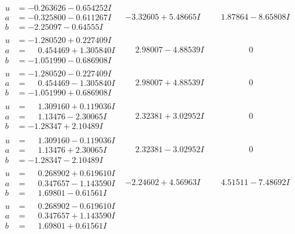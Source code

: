 \documentclass[1p]{elsarticle_modified}
\theoremstyle{definition}
\begin{document}
$$\begin{array}{c|c|c}
\begin{aligned}
u &= -0.263626 - 0.654252 I \\
a &= -0.325800 - 0.611267 I \\
b &= -2.25097 - 0.64555 I\end{aligned}
 & -3.32605 + 5.48665 I & \phantom{-}1.87864 - 8.65808 I \\ \hline\begin{aligned}
u &= -1.280520 + 0.227409 I \\
a &= \phantom{-}0.454469 + 1.305840 I \\
b &= -1.051990 - 0.686908 I\end{aligned}
 & \phantom{-}2.98007 - 4.88539 I & \phantom{-0.000000 } 0 \\ \hline\begin{aligned}
u &= -1.280520 - 0.227409 I \\
a &= \phantom{-}0.454469 - 1.305840 I \\
b &= -1.051990 + 0.686908 I\end{aligned}
 & \phantom{-}2.98007 + 4.88539 I & \phantom{-0.000000 } 0 \\ \hline\begin{aligned}
u &= \phantom{-}1.309160 + 0.119036 I \\
a &= \phantom{-}1.13476 - 2.30065 I \\
b &= -1.28347 + 2.10489 I\end{aligned}
 & \phantom{-}2.32381 + 3.02952 I & \phantom{-0.000000 } 0 \\ \hline\begin{aligned}
u &= \phantom{-}1.309160 - 0.119036 I \\
a &= \phantom{-}1.13476 + 2.30065 I \\
b &= -1.28347 - 2.10489 I\end{aligned}
 & \phantom{-}2.32381 - 3.02952 I & \phantom{-0.000000 } 0 \\ \hline\begin{aligned}
u &= \phantom{-}0.268902 + 0.619610 I \\
a &= \phantom{-}0.347657 - 1.143590 I \\
b &= \phantom{-}1.69801 - 0.61561 I\end{aligned}
 & -2.24602 + 4.56963 I & \phantom{-}4.51511 - 7.48692 I \\ \hline\begin{aligned}
u &= \phantom{-}0.268902 - 0.619610 I \\
a &= \phantom{-}0.347657 + 1.143590 I \\
b &= \phantom{-}1.69801 + 0.61561 I\end{aligned}

\end{array}$$
\end{document}
